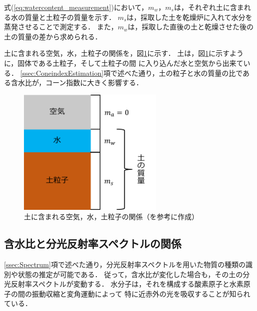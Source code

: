 \mbox{式(\ref{eq:watercontent_measurement})}において，$m_w$，$m_s$は，それぞれ土に含まれる水の質量と土粒子の質量を示す．
$m_s$は，採取した土を乾燥炉に入れて水分を蒸発させることで測定する．
また，$m_w$は，採取した直後の土と乾燥させた後の土の質量の差から求められる．

土に含まれる空気，水，土粒子の関係を，図\ref{fig:watercontent_measurement}に示す．
土は，図\ref{fig:watercontent_measurement}に示すように，固体である土粒子，そして土粒子の間
に入り込んだ水と空気から出来ている．
\ref{ssec:ConeindexEstimation}項で述べた通り，土の粒子と水の質量の比である含水比が，コーン指数に大きく影響する．

\begin{figure}[bp]
      \begin{center}
            \includegraphics[width=7cm]{./Ch4_WaterContentEstimation/Fig/watercontent_measurement_compressed.pdf}
            \vspace{1cm}
            \caption{土に含まれる空気，水，土粒子の関係（\cite{日本建設総合試験所2019}を参考に作成）}
            \label{fig:watercontent_measurement}
      \end{center}
\end{figure}

\clearpage

\subsection{含水比と分光反射率スペクトルの関係}
\label{ssec:RelationshipBetweenSpectrumAndWaterContent}


\ref{ssec:Spectrum}項で述べた通り，分光反射率スペクトルを用いた物質の種類の識別や状態の推定が可能である．
従って，含水比が変化した場合も，その土の分光反射率スペクトルが変動する．
水分子は，それを構成する酸素原子と水素原子の間の振動収縮と変角運動によって
特に近赤外の光を吸収することが知られている\cite{李2000}\cite{Lobell2002}\cite{Tian2015}．%

